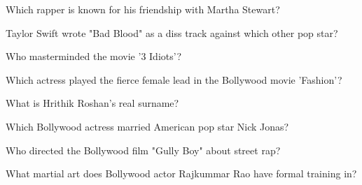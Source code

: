 \documentclass[12pt,a4paper]{book}
\begin{document}
\begin{enhancedmcq}[Question 19]{Which rapper is known for his friendship with Martha Stewart?}
\end{enhancedmcq}

\begin{enhancedmcq}[Question 20]{Taylor Swift wrote "Bad Blood" as a diss track against which other pop star?}
\end{enhancedmcq}

\begin{enhancedmcq}[Question 21]{Who masterminded the movie '3 Idiots'?}
\end{enhancedmcq}

\begin{enhancedmcq}[Question 22]{Which actress played the fierce female lead in the Bollywood movie 'Fashion'?}
\end{enhancedmcq}

\begin{enhancedmcq}[Question 23]{What is Hrithik Roshan's real surname?}
\end{enhancedmcq}

\begin{enhancedmcq}[Question 24]{Which Bollywood actress married American pop star Nick Jonas?}
\end{enhancedmcq}

\begin{enhancedmcq}[Question 25]{Who directed the Bollywood film "Gully Boy" about street rap?}
\end{enhancedmcq}

\begin{enhancedmcq}[Question 26]{What martial art does Bollywood actor Rajkummar Rao have formal training in?}
\end{enhancedmcq}
\end{document}
